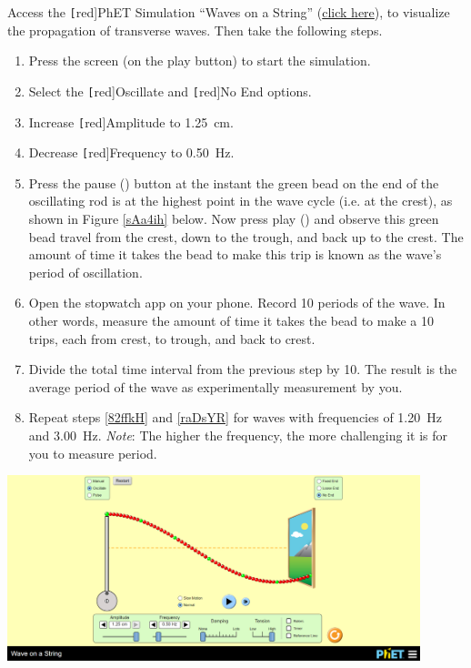 \documentclass[main.tex]{subfiles}
\begin{document}
\begin{example} \label{GlVTg1}
    Access the \texttt[red]{PhET Simulation} ``Waves on a String'' (\href{https://phet.colorado.edu/en/simulations/wave-on-a-string}{click here}), to visualize the propagation of transverse waves. Then take the following steps.
    
    \begin{enumerate}
    \setlength\itemsep{0.1ex}
        \item Press the screen (on the play button) to start the simulation.
        \item Select the \texttt[red]{Oscillate} and \texttt[red]{No End} options.
        \item Increase \texttt[red]{Amplitude} to \SI{1.25}{cm}.
        \item Decrease \texttt[red]{Frequency} to \SI{0.50}{Hz}.
        \item Press the pause ({\tiny \faPause}) button at the instant the green bead on the end of the oscillating rod is at the highest point in the wave cycle (i.e. at the crest), as shown in Figure \ref{sAa4ih} below. Now press play ({\tiny \faPlay}) and observe this green bead travel from the crest, down to the trough, and back up to the crest. The amount of time it takes the bead to make this trip is known as the wave's \gls{period} of oscillation. 
        \item \label{82ffkH} Open the stopwatch app on your phone. Record 10 periods of the wave. In other words, measure the amount of time it takes the bead to make a 10 trips, each from crest, to trough, and back to crest. 
        \item \label{raDsYR} Divide the total time interval from the previous step by 10. The result is the average period of the wave as experimentally measurement by you.
        \item Repeat steps \ref{82ffkH} and \ref{raDsYR} for waves with frequencies of \SI{1.20}{Hz} and \SI{3.00}{Hz}. \textit{Note}: The higher the frequency, the more challenging it is for you to measure period.
    \end{enumerate}
    
    
\end{example}

\begin{center}
    \includegraphics[width=12cm]{figures/Unit11_PhET_Wave.png}
    \captionsetup{type=figure,margin=1in}
    \label{sAa4ih}
\end{center}
\end{document}
